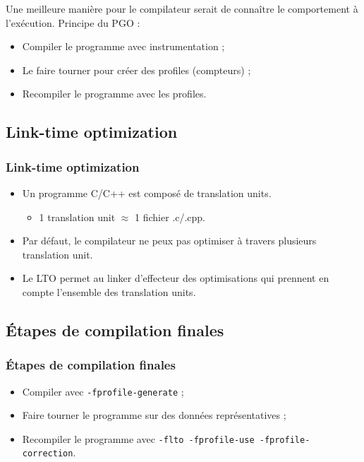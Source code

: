 \documentclass{beamer}
\begin{document}
\begin{frame}
    Une meilleure manière pour le compilateur serait de connaître le comportement à l'exécution.
    Principe du PGO :
    \begin{itemize}
        \item Compiler le programme avec instrumentation ;
        \item Le faire tourner pour créer des profiles (compteurs) ;
        \item Recompiler le programme avec les profiles.
    \end{itemize}
\end{frame}

\subsection{Link-time optimization}

\begin{frame}
    \frametitle{Link-time optimization}

    \begin{itemize}
        \item Un programme C/C++ est composé de translation units.
              \begin{itemize}
                  \item 1 translation unit $ \approx $ 1 fichier .c/.cpp.
              \end{itemize}
        \item Par défaut, le compilateur ne peux pas optimiser à travers plusieurs translation unit.
        \item Le LTO permet au linker d'effecteur des optimisations qui prennent en compte l'ensemble des translation units.
    \end{itemize}
\end{frame}

\subsection{Étapes de compilation finales}

\begin{frame}[fragile]
    \frametitle{Étapes de compilation finales}

    \begin{itemize}
        \item Compiler avec \verb'-fprofile-generate' ;
        \item Faire tourner le programme sur des données représentatives ;
        \item Recompiler le programme avec \verb'-flto -fprofile-use -fprofile-correction'.
    \end{itemize}
\end{frame}
\end{document}
